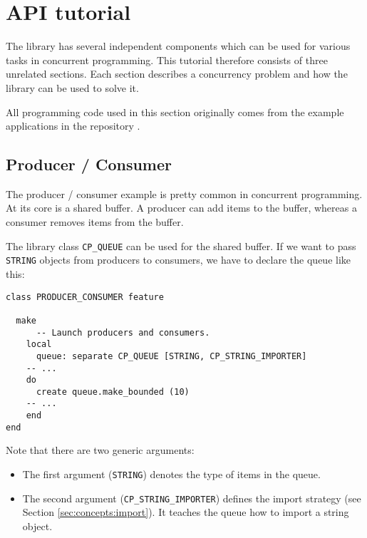 
\section {API tutorial}
\label{sec:tutorial}

The library has several independent components which can be used for various tasks in concurrent programming.
This tutorial therefore consists of three unrelated sections.
Each section describes a concurrency problem and how the library can be used to solve it.

All programming code used in this section originally comes from the example applications in the repository \cite{web:repository}.

\subsection{Producer / Consumer}

The producer / consumer example is pretty common in concurrent programming.
At its core is a shared buffer.
A producer can add items to the buffer, whereas a consumer removes items from the buffer.

The library class \lstinline!CP_QUEUE! can be used for the shared buffer.
If we want to pass \lstinline!STRING! objects from producers to consumers, we have to declare the queue like this:

\begin{lstlisting}
class PRODUCER_CONSUMER feature

  make
      -- Launch producers and consumers.
    local
      queue: separate CP_QUEUE [STRING, CP_STRING_IMPORTER]
	-- ...
    do
      create queue.make_bounded (10)
	-- ...
    end
end
\end{lstlisting}

Note that there are two generic arguments:
\begin{itemize}
\item The first argument (\lstinline!STRING!) denotes the type of items in the queue.
\item The second argument (\lstinline!CP_STRING_IMPORTER!) defines the import strategy (see Section \ref{sec:concepts:import}).
  It teaches the queue how to import a string object.
\end{itemize}


